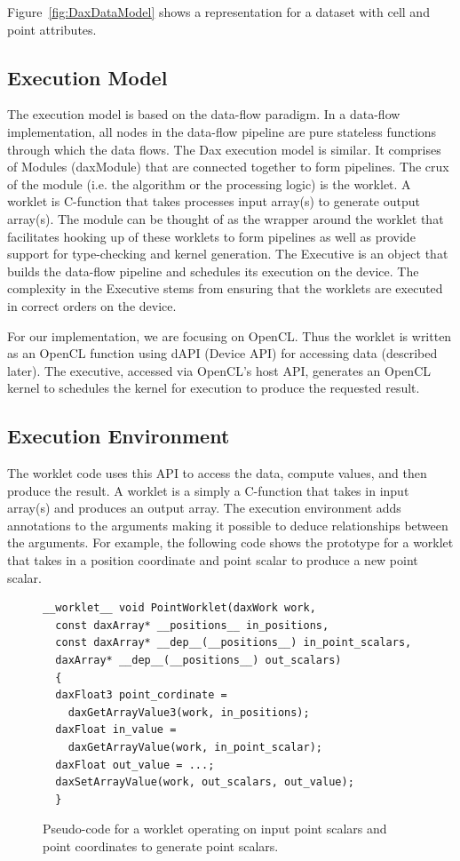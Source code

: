\documentclass{vgtc}                          %
\begin{document}
Figure~\ref{fig:DaxDataModel} shows a representation for a dataset with cell
and point attributes.


\subsection{Execution Model}
\label{sec:ExecutionModel}

The execution model is based on the data-flow paradigm. In a data-flow
implementation, all nodes in the data-flow pipeline are pure stateless functions
through which the data flows. The Dax execution model is similar. It comprises
of Modules (daxModule) that are connected together to form pipelines. The crux
of the module (i.e. the algorithm or the processing logic) is the worklet. A
worklet is C-function that takes processes input array(s) to generate output
array(s). The module can be thought of as the wrapper around the worklet that
facilitates hooking up of these worklets to form pipelines as well as provide
support for type-checking and kernel generation. The Executive
is an object that builds the data-flow pipeline and schedules its execution on
the device. The complexity in the Executive stems from ensuring that the
worklets are executed in correct orders on the device.

For our implementation, we are focusing on OpenCL. Thus the worklet is
written as an OpenCL function using dAPI (Device API) for accessing data
(described later). The executive, accessed via OpenCL's host API,
generates an OpenCL kernel to schedules the kernel for execution to produce
the requested result.

\subsection{Execution Environment}
\label{sec:ExecutionEnvironment}

The worklet code uses this API to access the data, compute values, and then
produce the result. A worklet is a simply a C-function that takes in input
array(s) and produces an output array. The execution environment adds annotations to the arguments
making it possible to deduce relationships between the arguments. For example, the
following code shows the prototype for a worklet that takes in a position
coordinate and point scalar to produce a new point scalar.

\begin{figure}[htbp]
\centering
{\small
\begin{verbatim}
__worklet__ void PointWorklet(daxWork work,
  const daxArray* __positions__ in_positions,
  const daxArray* __dep__(__positions__) in_point_scalars,
  daxArray* __dep__(__positions__) out_scalars)
  {
  daxFloat3 point_cordinate =
    daxGetArrayValue3(work, in_positions);
  daxFloat in_value =
    daxGetArrayValue(work, in_point_scalar);
  daxFloat out_value = ...;
  daxSetArrayValue(work, out_scalars, out_value);
  }
\end{verbatim}
}
\caption{Pseudo-code for a worklet operating on input point scalars and point
coordinates to generate point scalars.}
\label{fig:DaxPointWorklet}
\end{figure}
\end{document}
